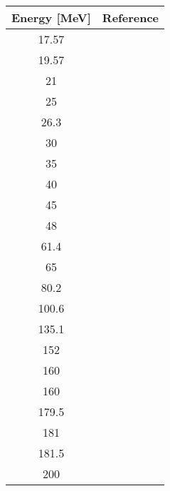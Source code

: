 \begin{tabular}{c  c} 
    \toprule 
    \bf{Energy [MeV]} & \bf{Reference} \\
    \midrule
    17.57 & \cite{Dicello71}\\
    19.57 & \cite{VanOers71}\\
    21 & \cite{Mccamis86}\\
    25 & \cite{Mccamis86}\\
    26.3 & \cite{Watson67, Mccamis86}\\
    30 & \cite{Mccamis86}\\
    35 & \cite{Mccamis86}\\
    40 & \cite{Mccamis86, Blumberg66}\\
    45 & \cite{Mccamis86}\\
    48 & \cite{Mccamis86}\\
    61.4 & \cite{Fulmer69}\\
    65 & \cite{Noro81}\\
    80.2 & \cite{Nadasen81, Schwandt82}\\
    100.6 & \cite{Seifert90}\\
    135.1 & \cite{Nadasen81}\\
    152 & \cite{Rolland66}\\
    160 & \cite{Roos65}\\
    160 & \cite{Schwandt82}\\
    179.5 & \cite{Johansson61}\\
    181 & \cite{Nadasen81, Schwandt82}\\
    181.5 & \cite{Johansson61}\\
    200 & \cite{Murdock87}\\
    \bottomrule
\end{tabular}
